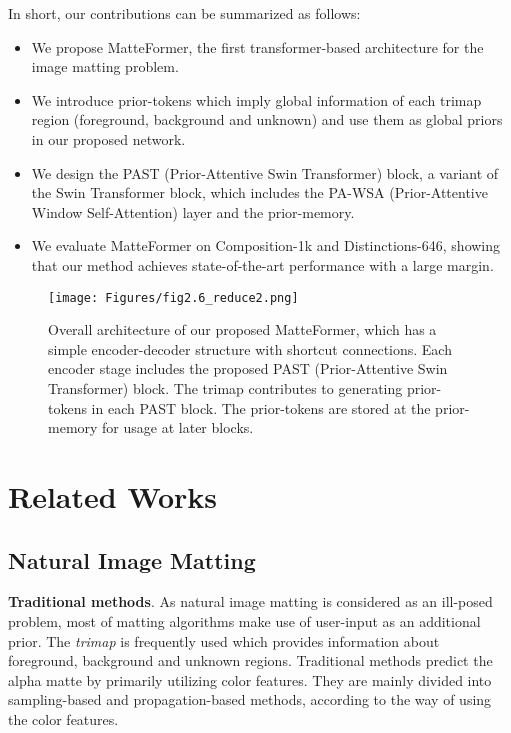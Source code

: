 \documentclass[10pt,twocolumn,letterpaper]{article}
\begin{document}
In short, our contributions can be summarized as follows:
\begin{itemize}
\vspace{-2mm}
\item We propose MatteFormer, the first transformer-based architecture for the image matting problem.
\vspace{-2mm}
\item We introduce prior-tokens which imply global information of each trimap region (foreground, background and unknown) and use them as global priors in our proposed network.
\vspace{-2mm}
\item We design the PAST (Prior-Attentive Swin Transformer) block, a variant of the Swin Transformer block, which includes the PA-WSA (Prior-Attentive Window Self-Attention) layer and the prior-memory. 
\vspace{-6mm}
\item We evaluate MatteFormer on Composition-1k and Distinctions-646, showing that our method achieves state-of-the-art performance with a large margin.
\end{itemize}

\begin{figure*}
  \begin{center}
  \texttt{[image: Figures/fig2.6\_reduce2.png]}
  \end{center}
  \vspace{-5mm}
  \caption{Overall architecture of our proposed MatteFormer, which has a simple encoder-decoder structure with shortcut connections. Each encoder stage includes the proposed PAST (Prior-Attentive Swin Transformer) block. The trimap contributes to generating prior-tokens in each PAST block. The prior-tokens are stored at the prior-memory for usage at later blocks.}
  \label{fig:MatteFormer}
\end{figure*}

\section{Related Works }
\label{sec:related works}

\subsection{Natural Image Matting}

\textbf{Traditional methods}.
As natural image matting is considered as an ill-posed problem, most of matting algorithms make use of user-input as an additional prior. The \textit{trimap} is frequently used which provides information about foreground, background and unknown regions.
Traditional methods predict the alpha matte by primarily utilizing color features. They are mainly divided into sampling-based and propagation-based methods, according to the way of using the color features.
\end{document}
